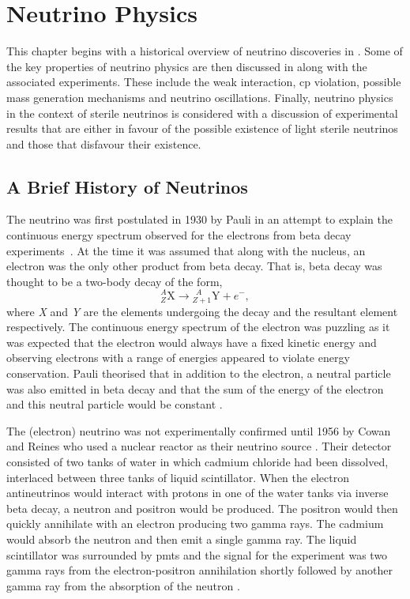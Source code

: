 \chapter{Neutrino Physics}
\label{chap:Neutrino Physics}

This chapter begins with a historical overview of neutrino discoveries in . Some of the key properties of neutrino physics are then discussed in  along with the associated experiments. These include the weak interaction, \gls{cp} violation, possible mass generation mechanisms and neutrino oscillations. Finally, neutrino physics in the context of sterile neutrinos is considered with a discussion of experimental results that are either in favour of the possible existence of light sterile neutrinos and those that disfavour their existence. 

\section{A Brief History of Neutrinos}\label{sec:history_of_neutrino_flavours}

The neutrino was first postulated in 1930 by Pauli in an attempt to explain the continuous energy spectrum observed for the electrons from beta decay experiments~\cite{Pauli_letter}. At the time it was assumed that along with the nucleus, an electron was the only other product from beta decay. That is, beta decay was thought to be a two-body decay of the form,
\begin{equation}
    {^A_Z}\text{X} \longrightarrow {^{\ \ A}_{Z+1}}\text{Y} + e^-,
\end{equation}
where \textit{X} and \textit{Y} are the elements undergoing the decay and the resultant element respectively. The continuous energy spectrum of the electron was puzzling as it was expected that the electron would always have a fixed kinetic energy and observing electrons with a range of energies appeared to violate energy conservation. Pauli theorised that in addition to the electron, a neutral particle was also emitted in beta decay and that the sum of the energy of the electron and this neutral particle would be constant \cite{Pauli_letter}.

The (electron) neutrino was not experimentally confirmed until 1956 by Cowan and Reines who used a nuclear reactor as their neutrino source \cite{cowan_and_reines_paper}. Their detector consisted of two tanks of water in which cadmium chloride had been dissolved, interlaced between three tanks of liquid scintillator. When the electron antineutrinos would interact with protons in one of the water tanks via inverse beta decay, a neutron and positron would be produced. The positron would then quickly annihilate with an electron producing two gamma rays. The cadmium would absorb the neutron and then emit a single gamma ray. The liquid scintillator was surrounded by \Glspl{pmt} and the signal for the experiment was two gamma rays from the electron-positron annihilation shortly followed by another gamma ray from the absorption of the neutron \cite{cowan_and_reines_paper}.

